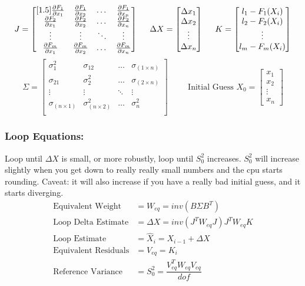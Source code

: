 \[
J = \begin{bmatrix}[1.5]
\frac{\partial F_1}{\partial x_1} & \frac{\partial F_1}{\partial x_2} & \dots & \frac{\partial F_1}{\partial x_n} \\
\frac{\partial F_2}{\partial x_1} & \frac{\partial F_2}{\partial x_2} & \dots & \frac{\partial F_2}{\partial x_n} \\
\vdots & \vdots & \ddots& \vdots \\
\frac{\partial F_m}{\partial x_1} & \frac{\partial F_m}{\partial x_2} & \dots & \frac{\partial F_m}{\partial x_n} \\
\end{bmatrix}
\hspace{0.5cm}
\Delta X = 
\begin{bmatrix}
\Delta x_1 \\ \Delta x_2 \\ \vdots \\ \Delta x_n
\end{bmatrix}
\hspace{0.5cm}
K = 
\begin{bmatrix}
l_1 - F_1(X_i) \\ l_2 - F_2(X_i)\\ \vdots \\ l_m - F_m(X_i)
\end{bmatrix}
\]
\[
\Sigma = 
\begin{bmatrix}
\sigma_{1}^2 & \sigma_{12} & \dots & \sigma_{(1\times n)} \\ 
\sigma_{21} & \sigma_{2}^2 & \dots & \sigma_{(2\times n)} \\ 
\vdots & \vdots & \ddots& \vdots \\
\sigma_{(n\times 1)} & \sigma_{(n\times 2)}^2 & \dots & \sigma_{n}^2 \\ 
\end{bmatrix}
\hspace{1cm}
\text{Initial Guess } X_0 = 
\begin{bmatrix}
x_1 \\ x_2 \\ \vdots \\ x_n
\end{bmatrix}
\]
\subsubsection{Loop Equations:}
Loop until $\Delta X $ is small, or more robustly, loop until $S_0^2$ increases.  $S_0^2$ will increase slightly when you get down to really really small numbers and the cpu starts rounding.  Caveat: it will also increase if you have a really bad initial guess, and it starts diverging.
\vspace{0.15cm}
\begin{align*}
	\text{Equivalent Weight} &=  W_{eq} = inv(B\Sigma B^T) \\
	\text{Loop Delta Estimate} &= \Delta X = inv(J^TW_{eq}J)J^TW_{eq}K \\
	\text{Loop Estimate} &=  \hat{X}_i = X_{i-1}+\Delta X \\
	\text{Equivalent Residuals} &= V_{eq} = K_i \\
	\text{Reference Variance} &= S_0^2 = \dfrac{V_{eq}^TW_{eq}V_{eq}}{dof}
\end{align*}
